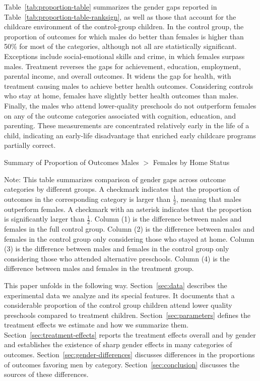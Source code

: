 Table~\ref{tab:proportion-table} summarizes the gender gaps reported in Table~\ref{tab:proportion-table-ranksign}, as well as those that account for the childcare environment of the control-group children. In the control group, the proportion of outcomes for which males do better than females is higher than 50\% for most of the categories, although not all are statistically significant. Exceptions include social-emotional skills and crime, in which females surpass males. Treatment reverses the gaps for achievement, education, employment, parental income, and overall outcomes. It widens the gap for health, with treatment causing males to achieve better health outcomes. Considering controls who stay at home, females have slightly better health outcomes than males. Finally, the males who attend lower-quality preschools do not outperform females on any of the outcome categories associated with cognition, education, and parenting. These measurements are concentrated relatively early in the life of a child, indicating an early-life disadvantage that enriched early childcare programs partially correct.

\begin{table}[H]
\centering
\caption{Summary of Proportion of Outcomes Males $>$ Females by Home Status}
\label{tab:proportion-table}
\begin{threeparttable}

\begin{tablenotes}
\footnotesize
\item Note: This table summarizes comparison of gender gaps across outcome categories by different groups. A checkmark indicates that the proportion of outcomes in the corresponding category is larger than $\frac{1}{2}$, meaning that males outperform females. A checkmark with an asterisk indicates that the proportion is significantly larger than $\frac{1}{2}$. Column (1) is the difference between males and females in the full control group.  Column (2) is the difference between males and females in the control group only considering those who stayed at home. Column (3) is the difference between males and females in the control group only considering those who attended alternative preschools. Column (4) is the difference between males and females in the treatment group.
\end{tablenotes}
\end{threeparttable}
\end{table}

This paper unfolds in the following way. Section~\ref{sec:data} describes the experimental data we analyze and its special features. It documents that a considerable proportion of the control group children attend lower quality preschools compared to treatment children. Section~\ref{sec:parameters} defines the treatment effects we estimate and how we summarize them. Section~\ref{sec:treatment-effects} reports the treatment effects overall and by gender and establishes the existence of sharp gender effects in many categories of outcomes. Section~\ref{sec:gender-differences} discusses differences in the proportions of outcomes favoring men by category. Section~\ref{sec:conclusion} discusses the sources of these differences.


